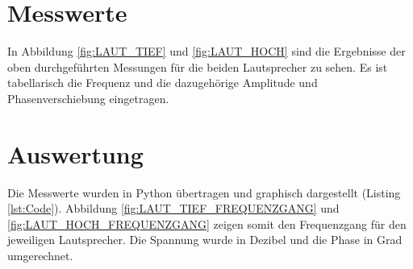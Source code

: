 \documentclass[12pt,oneside,a4paper]{report}
\begin{document}
\section{Messwerte}
\label{chap:VERSUCH_2_MESSWERTE}

In Abbildung \ref{fig:LAUT_TIEF} und \ref{fig:LAUT_HOCH} sind die Ergebnisse der oben durchgeführten Messungen für die beiden Lautsprecher zu sehen. Es ist tabellarisch die Frequenz und die dazugehörige Amplitude und Phasenverschiebung eingetragen.

\section{Auswertung}
\label{chap:VERSUCH_2_AUSWERTUNG}

Die Messwerte wurden in Python übertragen und graphisch dargestellt (Listing \ref{lst:Code}). Abbildung \ref{fig:LAUT_TIEF_FREQUENZGANG} und \ref{fig:LAUT_HOCH_FREQUENZGANG} zeigen somit den Frequenzgang für den jeweiligen Lautsprecher. Die Spannung wurde in Dezibel und die Phase in Grad umgerechnet.
\end{document}
